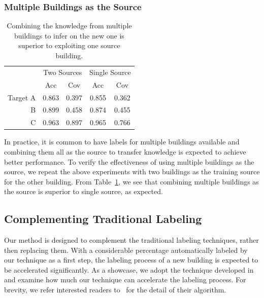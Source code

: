 \subsubsection{Multiple Buildings as the Source}
\begin{table}[h]
\centering
\begin{tabular}{r|cc|cc}
\hline
\multirow{2}{*}{} & \multicolumn{2}{c|}{Two Sources} & \multicolumn{2}{c}{Single Source} \\ \cline{2-5} 
 & Acc & Cov & Acc & Cov \\ \hline
Target A & 0.863 & 0.397 & 0.855 & 0.362 \\ \hline
B & 0.899 & 0.458 & 0.874 & 0.455 \\ \hline
C & 0.963 & 0.897 & 0.965 & 0.766 \\ \hline
\end{tabular}
\caption{Combining the knowledge from multiple buildings to infer on the new one is superior to exploiting one source building.}
\label{2source}
\end{table}

In practice, it is common to have labels for multiple buildings available and combining them all as the source to transfer knowledge is expected to achieve better performance.
To verify the effectiveness of using multiple buildings as the source, we repeat the above experiments with two buildings as the training source for the other building. From Table~\ref{2source}, we see that combining multiple buildings as the source is superior to single source, as expected.

\subsection{Complementing Traditional Labeling}
Our method is designed to complement the traditional labeling techniques, rather then replacing them.
With a considerable percentage automatically labeled by our technique as a first step, the labeling process of a new building is expected to be accelerated significantly.
As a showcase, we adopt the technique developed in~\cite{cikm} and examine how much our technique can accelerate the labeling process.
For brevity, we refer interested readers to~\cite{cikm} for the detail of their algorithm.

